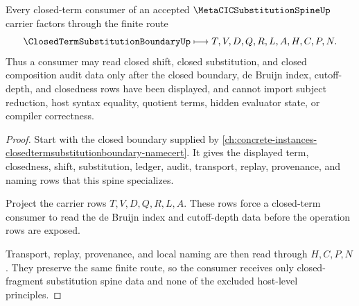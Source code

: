 \begin{theorem}
\label{thm:metacic-substitution-spine-closed-term-consumer}
Every closed-term consumer of an accepted $\MetaCICSubstitutionSpineUp$ carrier factors through the finite route
$$
\ClosedTermSubstitutionBoundaryUp \longmapsto
T,V,D,Q,R,L,A,H,C,P,N .
$$
Thus a consumer may read closed shift, closed substitution, and closed composition audit data only after the closed boundary, de Bruijn index, cutoff-depth, and closedness rows have been displayed, and cannot import subject reduction, host syntax equality, quotient terms, hidden evaluator state, or compiler correctness.
\end{theorem}
\begin{proof}
Start with the closed boundary supplied by \autoref{ch:concrete-instances-closedtermsubstitutionboundary-namecert}. It gives the displayed term, closedness, shift, substitution, ledger, audit, transport, replay, provenance, and naming rows that this spine specializes.

Project the carrier rows $T,V,D,Q,R,L,A$. These rows force a closed-term consumer to read the de Bruijn index and cutoff-depth data before the operation rows are exposed.

Transport, replay, provenance, and local naming are then read through $H,C,P,N$. They preserve the same finite route, so the consumer receives only closed-fragment substitution spine data and none of the excluded host-level principles.
\end{proof}


\begin{closurestatus}{\MetaCICSubstitutionSpineUp}
  \theoryclosure{\seedClosure}
  \formalstatus{\theoremCheckedV}
\end{closurestatus}
